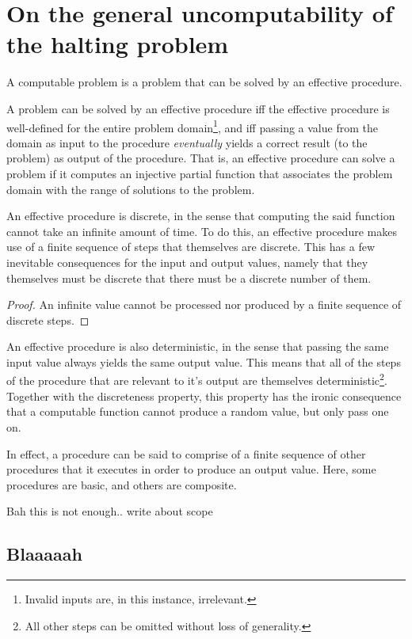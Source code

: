 \chapter{On the general uncomputability of the halting problem}

A computable problem is a problem that can be solved by an effective procedure.

A problem can be solved by an effective procedure iff the effective procedure
is well-defined for the entire problem domain\footnote{Invalid inputs are, in
this instance, irrelevant.}, and iff passing a value from the domain as input
to the procedure \emph{eventually} yields a correct result (to the problem) as
output of the procedure. That is, an effective procedure can solve a problem if
it computes an injective partial function that associates the problem domain
with the range of solutions to the problem.

An effective procedure is discrete, in the sense that computing the said
function cannot take an infinite amount of time. To do this, an effective
procedure makes use of a finite sequence of steps that themselves are discrete.
This has a few inevitable consequences for the input and output values, namely
that they themselves must be discrete that there must be a discrete number of
them.

\begin{proof} An infinite value cannot be processed nor produced by a finite
sequence of discrete steps.\end{proof}

An effective procedure is also deterministic, in the sense that passing the
same input value always yields the same output value. This means that all of
the steps of the procedure that are relevant to it's output are themselves
deterministic\footnote{All other steps can be omitted without loss of
generality.}. Together with the discreteness property, this property has the
ironic consequence that a computable function cannot produce a random value,
but only pass one on\cite{knuth-random}.

In effect, a procedure can be said to comprise of a finite sequence of other
procedures that it executes in order to produce an output value. Here, some
procedures are basic, and others are composite.

Bah this is not enough.. write about scope


\section{Blaaaaah}

